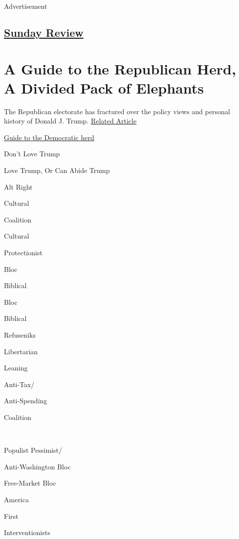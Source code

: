 Advertisement

\hypertarget{-sunday-review-}{%
\subsection{\texorpdfstring{
\href{https://www.nytimes3xbfgragh.onion/pages/opinion/index.html\#sundayreview}{Sunday
Review} }{ Sunday Review }}\label{-sunday-review-}}

\hypertarget{a-guide-to-the-republican-herd-a-divided-pack-of-elephants}{%
\section{A Guide to the Republican Herd, A Divided Pack of
Elephants}\label{a-guide-to-the-republican-herd-a-divided-pack-of-elephants}}

The Republican electorate has fractured over the policy views and
personal history of Donald J. Trump.
\href{https://www.nytimes3xbfgragh.onion/interactive/2016/11/06/sunday-review/another-party-another-fracture-the-democrats-election-2016.html}{Related
Article}

\href{http://www.nytimes3xbfgragh.onion/interactive/2016/11/06/sunday-review/another-party-another-fracture-the-democrats-election-2016.html}{Guide
to the Democratic herd}

Don't Love Trump

Love Trump, Or Can Abide Trump

Alt Right

Cultural

Coalition

Cultural

Protectionist

Bloc

Biblical

Bloc

Biblical

Refuseniks

Libertarian

Leaning

Anti-Tax/

Anti-Spending

Coalition

~

Populist Pessimist/

Anti-Washington Bloc

Free-Market Bloc

America

First

Interventionists

